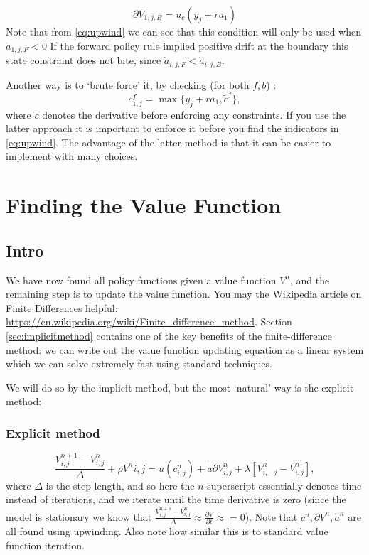 \documentclass[12pt]{article}
\DeclareMathOperator{\1}{\mathbbm{1}}
\begin{document}
    \begin{equation*}
        \partial V_{1,j,B} = u_c(y_j + r a_1)
    \end{equation*}
    Note that from \eqref{eq:upwind} we can see that this condition will only be used when $\dot a_{1,j,F}<0$ If the forward policy rule implied positive drift at the boundary this state constraint does not bite, since $\dot a_{i,j,F}<\dot a_{i,j,B}$.
    
    Another way is to `brute force' it, by checking     (for both $f,b$) :
    $$c_{1,j}^f=\max\{y_j+r a_1,\tilde c^f\},$$
where $\tilde c$ denotes the derivative before enforcing any constraints. If you use the latter approach it is important to enforce it before you find the indicators in \eqref{eq:upwind}. The advantage of the latter method is that it can be easier to implement with many choices.
    
    
	
\section{Finding the Value Function}
\subsection{Intro}
We have now found all policy functions given a value function $V^n$, and the remaining step is to update the value function. You may the Wikipedia article on Finite Differences helpful: \url{https://en.wikipedia.org/wiki/Finite_difference_method}. Section \ref{sec:implicitmethod} contains one of the key benefits of the finite-difference method: we can write out the value function updating equation as a linear system which we can solve extremely fast using standard techniques.

We will do so by the implicit method, but the most `natural' way is the explicit method:
\subsubsection{Explicit method}
\begin{equation}\label{eq:explicit}
\frac{V^{n+1}_{i,j} - V^n_{i,j}}\Delta + \rho V^n{i,j} =u(c^n_{i,j}) + \dot a \partial V^n_{i,j} + \lambda [V^n_{i,-j} - V^n_{i,j}],
\end{equation}
where $\Delta$ is the step length, and so here the $n$ superscript essentially denotes time instead of iterations, and we iterate until the time derivative is zero (since the model is stationary we know that $\frac{V^{n+1}_{i,j} - V^n_{i,j}}\Delta\approx \frac{\partial V}{\partial t}\approx =0$). Note that $c^n,\partial V^n, \dot a^n$ are all found using upwinding. Also note how similar this is to standard value function iteration.
\end{document}

